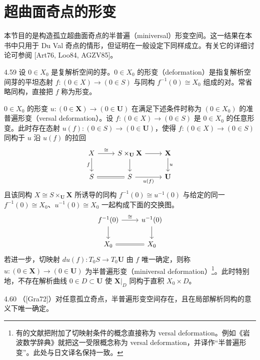 \section{超曲面奇点的形变}


本节目的是构造孤立超曲面奇点的半普遍（miniversal）形变空间。这一结果在本书中只用于 Du Val 奇点的情形，但证明在一般设定下同样成立。有关它的详细讨论可参阅 [Art76, Loo84, AGZV85]。

\begin{definition}{4.59}
设 $0\in X_0$ 是复解析空间的芽。$0\in X_0$ 的形变（deformation）是指复解析空间芽的平坦态射 $f:(0\in X)\to(0\in S)$ 与同构 $f^{-1}(0)\cong X_0$ 组成的对。常省略同构，直接把 $f$ 称为形变。

$0\in X_0$ 的形变 $u:(0\in\mathbf X)\to(0\in\mathbf U)$ 在满足下述条件时称为 $(0\in X_0)$ 的准普遍形变（versal deformation）。设 $f:(0\in X)\to(0\in S)$ 是 $0\in X_0$ 的任意形变。此时存在态射 $u(f):(0\in S)\to(0\in\mathbf U)$，使得 $f:(0\in X)\to(0\in S)$
同构于 $u$ 沿 $u(f)$ 的拉回
\[
\begin{tikzcd}
X \arrow[r,"\cong"] \arrow[d,"f"'] & S\times_{\mathbf U}\mathbf X \arrow[r] \arrow[d] & \mathbf X \arrow[d,"u"] \\
S \arrow[r,equals] & S \arrow[r,"u(f)"'] & \mathbf U
\end{tikzcd}
\]
且该同构 $X\cong S\times_{\mathbf U}\mathbf X$ 所诱导的同构 $f^{-1}(0)\cong u^{-1}(0)$ 与给定的同一 $f^{-1}(0)\cong X_0$、$u^{-1}(0)\cong X_0$ 一起构成下面的交换图。
\[
\begin{tikzcd}
f^{-1}(0) \arrow[r,"\cong"] \arrow[d] & u^{-1}(0) \arrow[d] \\
X_0 \arrow[r,equals] & X_0
\end{tikzcd}
\]
若进一步，切映射 $du(f):T_0S\to T_0\mathbf U$ 由 $f$ 唯一确定，则称 $u:(0\in\mathbf X)\to(0\in\mathbf U)$ 为半普遍形变（miniversal deformation）\footnote{有的文献把附加了切映射条件的概念直接称为 versal deformation。例如《岩波数学辞典》就把这一受限概念称为 versal deformation，并译作“半普遍形变”。此处与日文译名保持一致。}。此时特别地，不存在解析曲线 $0\in D\subset\mathbf U$ 使 $\mathbf X|_D$ 同构于直积 $X_0\times D$。
\end{definition}

\begin{theorem*}{4.60}
（[Gra72]）对任意孤立奇点，半普遍形变空间存在，且在局部解析同构的意义下唯一确定。
\end{theorem*}

